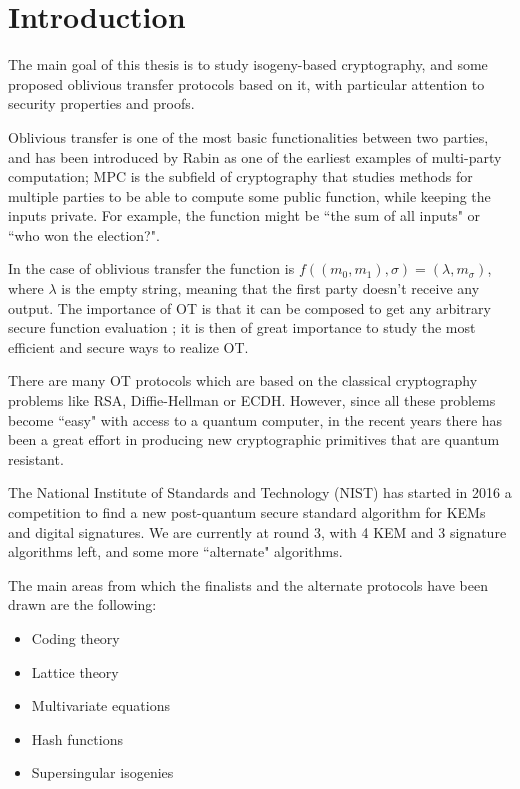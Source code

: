 \chapter*{Introduction}

The main goal of this thesis is to study isogeny-based cryptography, and some proposed oblivious transfer protocols based on it, with particular attention to security properties and proofs.

Oblivious transfer is one of the most basic functionalities between two parties, and has been introduced by Rabin \cite{Rabin_OT} as one of the earliest examples of multi-party computation; MPC is the subfield of cryptography that studies methods for multiple parties to be able to compute some public function, while keeping the inputs private. For example, the function might be ``the sum of all inputs" or ``who won the election?".

In the case of oblivious transfer the function is $f((m_0,m_1),\sigma)=(\lambda,m_\sigma)$, where $\lambda$ is the empty string, meaning that the first party doesn't receive any output. The importance of OT is that it can be composed to get any arbitrary secure function evaluation \cite{GMW}; it is then of great importance to study the most efficient and secure ways to realize OT.

There are many OT protocols which are based on the classical cryptography problems like RSA, Diffie-Hellman or ECDH. However, since all these problems become ``easy" with access to a quantum computer, in the recent years there has been a great effort in producing new cryptographic primitives that are quantum resistant.

The National Institute of Standards and Technology (NIST) has started in 2016 a competition to find a new post-quantum secure standard algorithm for KEMs and digital signatures. We are currently at round 3, with 4 KEM and 3 signature algorithms left, and some more ``alternate" algorithms.

The main areas from which the finalists and the alternate protocols have been drawn are the following:
\begin{itemize}
    \item Coding theory
    \item Lattice theory
    \item Multivariate equations
    \item Hash functions
    \item Supersingular isogenies
\end{itemize}

